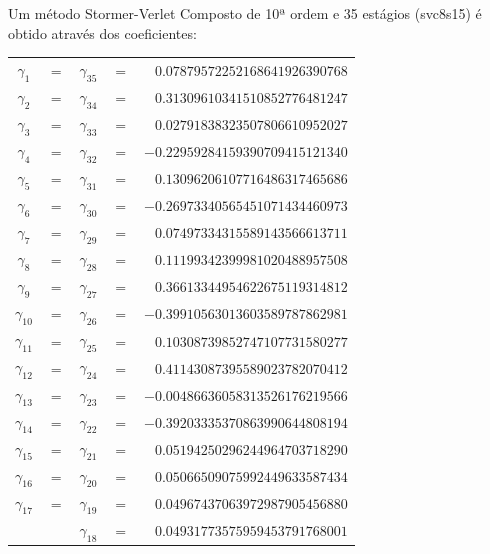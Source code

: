 \begin{method}[svcp10s35]\label{metodo:svcp10s35}\citep[158]{Hairer2006-oz}
    Um método Stormer-Verlet Composto de 10ª ordem e 35 estágios (svc8s15) é obtido através dos coeficientes:
    \begin{center}
        \begin{tabular}{ccccr}        
        $\gamma_1$  &$=$& $\gamma_{35}$ &$=$& $ 0.07879572252168641926390768$ \\
        $\gamma_2$  &$=$& $\gamma_{34}$ &$=$& $ 0.31309610341510852776481247$ \\
        $\gamma_3$  &$=$& $\gamma_{33}$ &$=$& $ 0.02791838323507806610952027$ \\
        $\gamma_4$  &$=$& $\gamma_{32}$ &$=$& $-0.22959284159390709415121340$ \\
        $\gamma_5$  &$=$& $\gamma_{31}$ &$=$& $ 0.13096206107716486317465686$ \\
        $\gamma_6$  &$=$& $\gamma_{30}$ &$=$& $-0.26973340565451071434460973$ \\
        $\gamma_7$  &$=$& $\gamma_{29}$ &$=$& $ 0.07497334315589143566613711$ \\
        $\gamma_8$  &$=$& $\gamma_{28}$ &$=$& $ 0.11199342399981020488957508$ \\
        $\gamma_9$  &$=$& $\gamma_{27}$ &$=$& $ 0.36613344954622675119314812$ \\
        $\gamma_{10}$ &$=$& $\gamma_{26}$ &$=$& $-0.39910563013603589787862981$ \\
        $\gamma_{11}$ &$=$& $\gamma_{25}$ &$=$& $ 0.10308739852747107731580277$ \\
        $\gamma_{12}$ &$=$& $\gamma_{24}$ &$=$& $ 0.41143087395589023782070412$ \\
        $\gamma_{13}$ &$=$& $\gamma_{23}$ &$=$& $-0.00486636058313526176219566$ \\
        $\gamma_{14}$ &$=$& $\gamma_{22}$ &$=$& $-0.39203335370863990644808194$ \\
        $\gamma_{15}$ &$=$& $\gamma_{21}$ &$=$& $ 0.05194250296244964703718290$ \\
        $\gamma_{16}$ &$=$& $\gamma_{20}$ &$=$& $ 0.05066509075992449633587434$ \\
        $\gamma_{17}$ &$=$& $\gamma_{19}$ &$=$& $ 0.04967437063972987905456880$ \\
                    &   & $\gamma_{18}$ &$=$& $ 0.04931773575959453791768001$ \\
        \end{tabular}
    \end{center}
\end{method}

